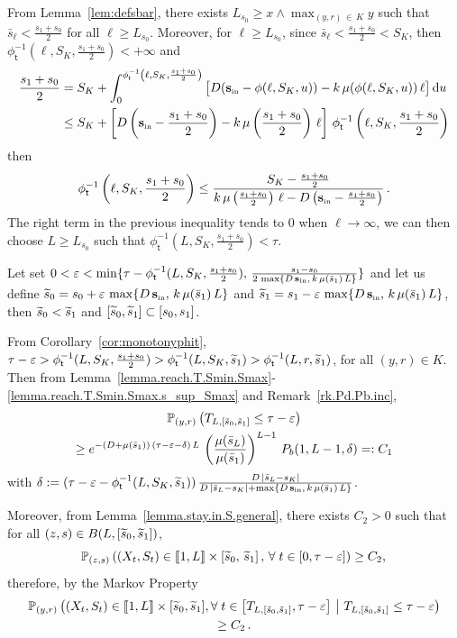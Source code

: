\documentclass[AHL,Unicode,longabstracts,published]{cedram}
\newcommand{\llbracket}{\mathopen{[\mkern -2.7mu[}}
\newcommand{\rrbracket}{\mathclose{]\mkern -2.7mu]}}
\newcommand{\PP}{\mathbb{P}}
\newcommand{\Sin}{{\mathbf s}_{\textrm{\tiny\rm in}}}
\newcommand{\dif}{\mathrm{d}}
\newcommand{\barmu}{\mu(\bar s_1)}
\newcommand{\phit}{\phi_\textsf{t}^{-1}}
\newcommand{\1}{\mathbf{1}}
\let\oldtilde\tilde
\renewcommand*{\tilde}[1]{\mathchoice{\widetilde{#1}}{\widetilde{#1}}{\oldtilde{#1}}{\oldtilde{#1}}}
\let\oldforall\forall
\renewcommand*{\forall}{\mathrel{\oldforall}}
\begin{document}
From Lemma~\ref{lem:defsbar}, there exists $L_{s_0} \geq x\wedge \max_{(y,r)\,\in\,K}y$ such that $\bar s_\ell <\frac{s_1+s_0}{2}$ for all $\ell \geq L_{s_0}$. Moreover, for $\ell \geq L_{s_0}$, since $\bar s_\ell<\frac{s_1+s_0}{2}<S_K$, then $\phit(\ell,S_K, \frac{s_1+s_0}{2})<+\infty$ and
\begin{align*}
\frac{s_1+s_0}{2} &= S_K + \int_0^{\phit\left(\ell,S_K, \frac{s_1+s_0}{2}\right)}
\big[D(\Sin-\phi(\ell,S_K,u))-k\,\mu(\phi(\ell,S_K,u))\,\ell\big]\,\dif u
\\
&\leq S_K +
\left[D\left(\Sin-\frac{s_1+s_0}{2}\right)-k\,\mu\left(\frac{s_1+s_0}{2}\right)\,\ell\right]\,\phit\left(\ell,S_K, \frac{s_1+s_0}{2}\right)
\end{align*}
then
\[
\phit\left(\ell,S_K, \frac{s_1+s_0}{2}\right)
\leq \frac{S_K-\frac{s_1+s_0}{2}}{k\,\mu\left(\frac{s_1+s_0}{2}\right)\,\ell-D\left(\Sin-\frac{s_1+s_0}{2}\right)}\,.
\]
The right term in the previous inequality tends to 0 when $\ell \to \infty$, we can then choose $L \geq L_{s_0}$ such that $\phit(L,S_K,  \frac{s_1+s_0}{2}) <\tau$.


Let set $0<\varepsilon<\min\{\tau-\phit(L,S_K, \frac{s_1+s_0}{2}),\,\frac{s_1-s_0}{2\,\max\{D\,\Sin,\, k\,\barmu\, L\}}\}$ and let us define $\tilde s_0 = s_0+\varepsilon\,\max\{D\,\Sin,\, k\,\barmu\, L\}$ and $\tilde s_1 = s_1-\varepsilon\,\max\{D\,\Sin,\, k\,\barmu\, L\}$, then $\tilde s_0<\tilde s_1$ and $[\tilde s_0, \tilde s_1] \subset [s_0,s_1]$.
 
From Corollary~\ref{cor:monotonyphit}, $\tau-\varepsilon>\phit(L,S_K, \frac{s_1+s_0}{2})>\phit(L,S_K, \tilde s_1)>\phit(L,r, \tilde s_1)$, for all $(y,r)\in K$. Then from Lemma~\ref{lemma.reach.T.Smin.Smax}-\ref{lemma.reach.T.Smin.Smax.s_sup_Smax} and Remark~\ref{rk.Pd.Pb.inc},
\begin{multline}\label{lemma.reach.small.substrate.proba1}
\PP_{(y,r)}\left(T_{L,[\tilde s_0,\tilde s_1]}\leq \tau-\varepsilon\right) \\
\geq e^{-(D+\barmu)\,(\tau-\varepsilon-\delta)\,L}\,
\left(\frac{\mu(\bar s_L)}{\barmu}\right)^{L-1}\,P_b(1,L-1, \delta)=:C_1
\end{multline}
with $\delta:=(\tau-\varepsilon-\phit(L, S_K,\tilde s_1))\,\frac{D\,|\bar s_L-s_K|}{D\,|\bar s_{L}-s_K|+\max\{D\,\Sin,\,k\,\barmu\,L\}}$.

Moreover, from Lemma~\ref{lemma.stay.in.S.general}, there exists $C_2>0$ such that for all $(z,s)\in\linebreak B(L, [\tilde s_0,\tilde s_1])$,
\[
\PP_{(z,s)}\left((X_t,S_t) \in \llbracket 1,L\rrbracket \times \left[\tilde s_0, \, \tilde s_1\right],\,
\forall t\in[0,\tau-\varepsilon]\right)\geq C_2,\,
\]
therefore, by the Markov Property
\begin{multline}\label{lemma.reach.small.substrate.proba2}
\PP_{(y,r)}
\left((X_t,S_t)\in \llbracket 1, L \rrbracket \times [\tilde s_0,\tilde s_1],
\forall t\in \left[T_{ L,[\tilde s_0,\tilde s_1]},\tau-\varepsilon\right] \ \middle| \ T_{ L,[\tilde s_0,\tilde s_1]}
\leq \tau-\varepsilon\right)
\\ \geq C_2\,.
\end{multline}
\end{document}
